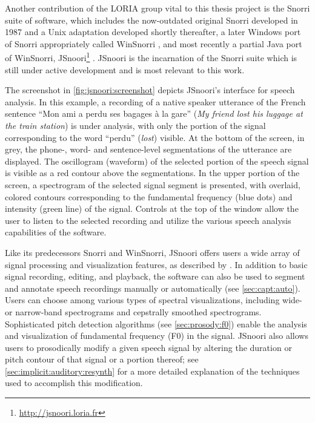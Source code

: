 	Another contribution of the LORIA group vital to this thesis project is 
	the Snorri suite of software, 
	which includes the now-outdated original Snorri developed in 1987 \citep{Fohr1989} and a Unix adaptation developed shortly thereafter,
	a later Windows port of Snorri appropriately called WinSnorri \citep{Laprie1999},
	and most recently a partial Java port of WinSnorri, JSnoori\footnote{\url{http://jsnoori.loria.fr}} \citep{Parole2013}. 
	JSnoori is the incarnation of the Snorri suite which is still under active development and is 
	most relevant to this work.

	
	The screenshot in \cref{fig:jsnoori:screenshot} depicts JSnoori's interface for speech analysis. In this example, a recording of a native speaker utterance of the French sentence ``Mon ami a perdu ses bagages à la gare'' (\textit{My friend lost his luggage at the train station}) is under analysis, with only the portion of the signal corresponding to the word ``perdu'' (\textit{lost}) visible.  At the bottom of the screen, in grey, the phone-, word- and sentence-level segmentations of the utterance are displayed. The oscillogram (waveform) of the selected portion of the speech signal is visible as a red contour above the segmentations.  In the upper portion of the screen, a spectrogram of the selected signal segment is presented, with overlaid, colored contours corresponding to the fundamental frequency (blue dots) and intensity (green line) of the signal. Controls at the top of the window allow the user to listen to the selected recording and utilize the various speech analysis capabilities of the software.
	
	Like its predecessors Snorri and WinSnorri, JSnoori offers users a wide array of signal processing and visualization features, as described by \textcite{Fohr1989,Laprie1999}. 
	In addition to basic signal recording, editing, and playback, the software can also be used to segment and annotate speech recordings manually or automatically (see \cref{sec:capt:auto}). 
	Users can choose among various types of spectral visualizations, including wide- or narrow-band spectrograms and cepstrally smoothed spectrograms. 
	Sophisticated pitch detection algorithms (see \cref{sec:prosody:f0}) enable the analysis and visualization of fundamental frequency (F0) 
	in the signal. 
	JSnoori also allows users to prosodically modify a given speech signal by altering the duration or pitch contour of that signal or a portion thereof; see \cref{sec:implicit:auditory:resynth} for a more detailed explanation of the techniques used to accomplish this modification.
	
